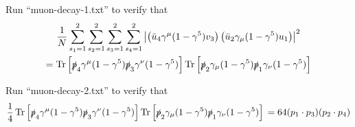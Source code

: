 \documentclass[12pt]{article}
\begin{document}
\bigskip
\noindent
Run ``muon-decay-1.txt'' to verify that
\begin{multline*}
\frac{1}{N}
\sum_{s_1=1}^2\sum_{s_2=1}^2\sum_{s_3=1}^2\sum_{s_4=1}^2
\left|
\left(\bar{u}_4\gamma^\mu(1-\gamma^5)v_3\right)
\left(\bar{u}_2\gamma_\mu(1-\gamma^5)u_1\right)
\right|^2
\\=
\mathop{\text{Tr}}
\left[\slashed{p}_4\gamma^\mu(1-\gamma^5)\slashed{p}_3\gamma^\nu(1-\gamma^5)\right]
\mathop{\text{Tr}}
\left[\slashed{p}_2\gamma_\mu(1-\gamma^5)\slashed{p}_1\gamma_\nu(1-\gamma^5)\right]
\end{multline*}

\noindent
Run ``muon-decay-2.txt'' to verify that
$$
\frac{1}{4}
\mathop{\text{Tr}}
\left[\slashed{p}_4\gamma^\mu(1-\gamma^5)\slashed{p}_3\gamma^\nu(1-\gamma^5)\right]
\mathop{\text{Tr}}
\left[\slashed{p}_2\gamma_\mu(1-\gamma^5)\slashed{p}_1\gamma_\nu(1-\gamma^5)\right]\\
=64(p_1\cdot p_3)(p_2\cdot p_4)
$$
\end{document}
